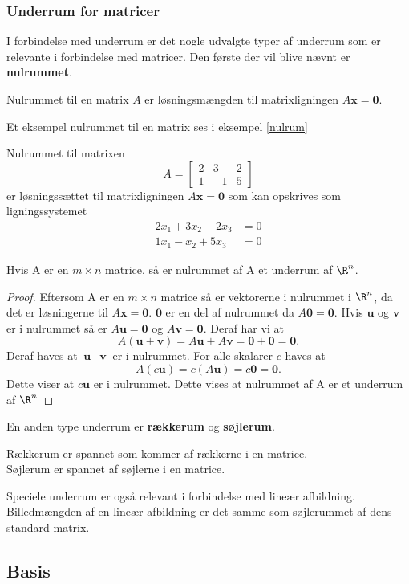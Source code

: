 \subsubsection{Underrum for matricer}
I forbindelse med underrum er det nogle udvalgte typer af underrum som er relevante i forbindelse med matricer. Den første der vil blive nævnt er \textbf{nulrummet}.
\begin{defn}{}{}
Nulrummet til en matrix $A$ er løsningsmængden til matrixligningen $A\textbf{x}=\textbf{0}$. 
\end{defn}
Et eksempel nulrummet til en matrix ses i eksempel \ref{nulrum}

\begin{eks}\label{nulrum}
Nulrummet til matrixen
$$A=\begin{bmatrix}
2 & 3 & 2\\
1 & -1 & 5
\end{bmatrix}$$
er løsningssættet til matrixligningen $A\textbf{x}=\textbf{0}$
som kan opskrives som ligningssystemet
\begin{align*}
2x_1+3x_2+2x_3&=0\\
1x_1-x_2+5x_3&=0
\end{align*}
\end{eks} 
\begin{thm}{}{}
Hvis A er en $m\times n$ matrice, så er nulrummet af A et underrum af $\R^n$.
\end{thm}
\begin{proof}
Eftersom A er en $m\times n$ matrice så er vektorerne i nulrummet i $\R^n$, da det er løsningerne til $A\textbf{x}=\textbf{0}$. $\textbf{0}$ er en del af nulrummet da $A\textbf{0}=\textbf{0}$. Hvis $\textbf{u}$ og $\textbf{v}$ er i nulrummet så er $A\textbf{u}=\textbf{0}$ og $A\textbf{v}=\textbf{0}$. Deraf har vi at
$$A(\textbf{u}+\textbf{v})=A\textbf{u}+A\textbf{v}=\textbf{0}+\textbf{0}=\textbf{0}.$$
Deraf haves at $\textbf{u}+\textbf{v}$ er i nulrummet. For alle skalarer $c$ haves at
$$A(c\textbf{u})=c(A\textbf{u})=c\textbf{0}=\textbf{0}.$$
Dette viser at $c\textbf{u}$ er i nulrummet.
Dette vises at nulrummet af A er et underrum af $\R^n$
\end{proof}
\noindent
En anden type underrum er \textbf{rækkerum} og \textbf{søjlerum}.
\begin{defn}{}{}
Rækkerum er spannet som kommer af rækkerne i en matrice.\\
Søjlerum er spannet af søjlerne i en matrice.
\end{defn}
\noindent
Speciele underrum er også relevant i forbindelse med lineær afbildning.
Billedmængden af en lineær afbildning er det samme som søjlerummet af dens standard matrix.

\subsection{Basis}
